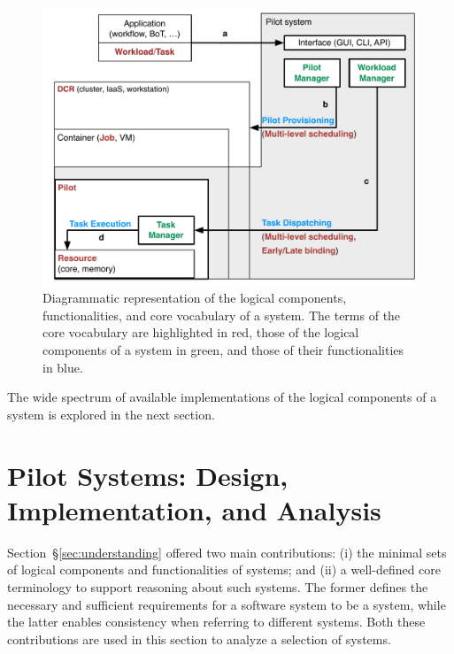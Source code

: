 \documentclass{sig-alternate}
\begin{document}
\begin{figure}[t]
    \centering
        \includegraphics[width=.48\textwidth]{figures/core_vocabulary.pdf}
    \caption{Diagrammatic representation of the logical components,
    functionalities, and core vocabulary of a \pilot system. The terms of the
    core vocabulary are highlighted in red, those of the logical components of a
    \pilot system in green, and those of their functionalities in blue.}
    \label{fig:core_vocabulary}
\end{figure}


The wide spectrum of available implementations of the logical components of a
\pilot system is explored in the next section.



\section{Pilot Systems: Design, Implementation, and Analysis}
\label{sec:analysis}

Section~\S\ref{sec:understanding} offered two main contributions: (i) the
minimal sets of logical components and functionalities of \pilot systems; and
(ii) a well-defined core terminology to support reasoning about such systems.
The former defines the necessary and sufficient requirements for a software
system to be a \pilot system, while the latter enables consistency when
referring to different \pilot systems. Both these contributions are used in this
section to analyze a selection of \pilot systems.
\end{document}
